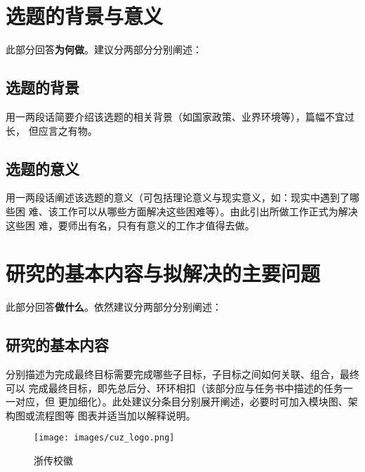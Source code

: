 \section{选题的背景与意义}

\begin{tcolorbox}
	此部分回答\textbf{为何做}。建议分两部分分别阐述：
\end{tcolorbox}

\subsection{选题的背景}

\begin{tcolorbox}
	用一两段话简要介绍该选题的相关背景（如国家政策、业界环境等），篇幅不宜过长，
	但应言之有物。
\end{tcolorbox}

\subsection{选题的意义}

\begin{tcolorbox}
	用一两段话阐述该选题的意义（可包括理论意义与现实意义，如：现实中遇到了哪些困
	难、该工作可以从哪些方面解决这些困难等）。由此引出所做工作正式为解决这些困
	难，要师出有名，只有有意义的工作才值得去做。
\end{tcolorbox}

\section{研究的基本内容与拟解决的主要问题}

\begin{tcolorbox}
	此部分回答\textbf{做什么}。依然建议分两部分分别阐述：
\end{tcolorbox}

\subsection{研究的基本内容}

\begin{tcolorbox}
	分别描述为完成最终目标需要完成哪些子目标，子目标之间如何关联、组合，最终可以
	完成最终目标，即先总后分、环环相扣（该部分应与任务书中描述的任务一一对应，但
	更加细化）。此处建议分条目分别展开阐述，必要时可加入模块图、架构图或流程图等
	图表并适当加以解释说明。
\end{tcolorbox}
\begin{figure}[h]
	\centering
	\texttt{[image: images/cuz\_logo.png]}
	\caption{浙传校徽}
	\label{fig:1}
\end{figure}

